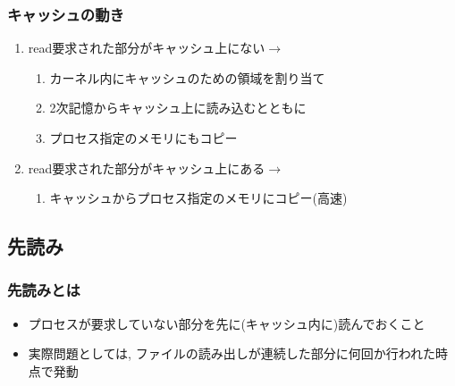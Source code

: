 \documentclass[12pt,dvipdfmx]{beamer}
\begin{document}
\begin{frame}
  \frametitle{キャッシュの動き}
  \begin{enumerate}
  \item <2-> read要求された部分がキャッシュ上にない$\rightarrow$
    \begin{enumerate}
    \item <3-> カーネル内にキャッシュのための領域を割り当て
    \item <4-> 2次記憶からキャッシュ上に読み込むとともに
    \item <5-> プロセス指定のメモリにもコピー
    \end{enumerate}
  \item <6-> read要求された部分がキャッシュ上にある$\rightarrow$
    \begin{enumerate}
    \item <7-> キャッシュからプロセス指定のメモリにコピー(高速)
    \end{enumerate}
  \end{enumerate}
  
  \begin{center}
  \end{center}
\end{frame}

\subsection{先読み}

\begin{frame}
  \frametitle{先読みとは}
  \begin{itemize}
  \item プロセスが要求していない部分を先に(キャッシュ内に)読んでおくこと
  \item 実際問題としては, ファイルの読み出しが連続した部分に何回か行われた時点で発動
  \end{itemize}
\end{frame}
\end{document}
